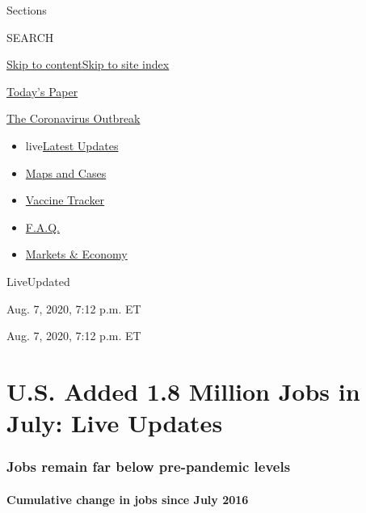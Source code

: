 Sections

SEARCH

\protect\hyperlink{site-content}{Skip to
content}\protect\hyperlink{site-index}{Skip to site index}

\href{https://myaccount.nytimes3xbfgragh.onion/auth/login?response_type=cookie\&client_id=vi}{}

\href{https://www.nytimes3xbfgragh.onion/section/todayspaper}{Today's
Paper}

\href{https://www.nytimes3xbfgragh.onion/news-event/coronavirus}{The
Coronavirus Outbreak}

\begin{itemize}
\tightlist
\item
  live\href{https://www.nytimes3xbfgragh.onion/2020/08/07/world/covid-19-news.html}{Latest
  Updates}
\item
  \href{https://www.nytimes3xbfgragh.onion/interactive/2020/us/coronavirus-us-cases.html}{Maps
  and Cases}
\item
  \href{https://www.nytimes3xbfgragh.onion/interactive/2020/science/coronavirus-vaccine-tracker.html}{Vaccine
  Tracker}
\item
  \href{https://www.nytimes3xbfgragh.onion/interactive/2020/world/coronavirus-tips-advice.html}{F.A.Q.}
\item
  \href{https://www.nytimes3xbfgragh.onion/live/2020/08/07/business/stock-market-today-coronavirus}{Markets
  \& Economy}
\end{itemize}

LiveUpdated~

Aug. 7, 2020, 7:12 p.m. ET

Aug. 7, 2020, 7:12 p.m. ET

\hypertarget{us-added-18-million-jobs-in-july-live-updates}{%
\section{U.S. Added 1.8 Million Jobs in July: Live
Updates}\label{us-added-18-million-jobs-in-july-live-updates}}

\hypertarget{jobs-remain-far-below-pre-pandemic-levels}{%
\subsubsection{Jobs remain far below pre-pandemic
levels}\label{jobs-remain-far-below-pre-pandemic-levels}}

\hypertarget{cumulative-change-in-jobs-since-july-2016}{%
\paragraph{Cumulative change in jobs since July
2016}\label{cumulative-change-in-jobs-since-july-2016}}

